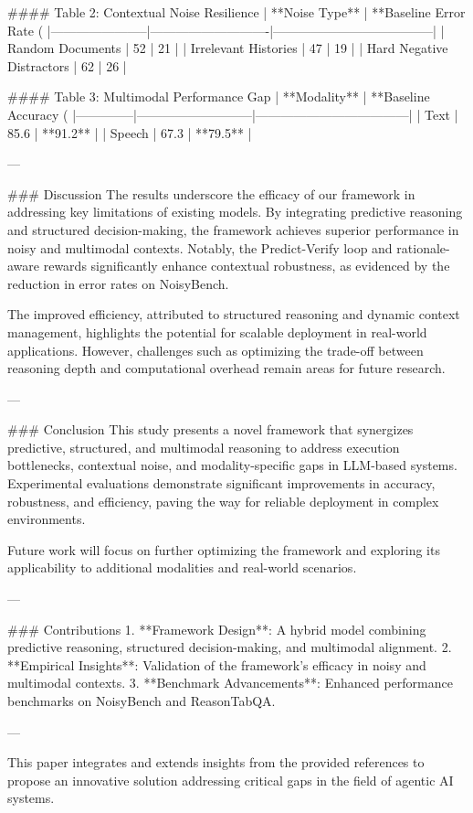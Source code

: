 #### Table 2: Contextual Noise Resilience
| **Noise Type**       | **Baseline Error Rate (%
|-----------------------|----------------------------|--------------------------------------|
| Random Documents     | 52                         | 21                                   |
| Irrelevant Histories | 47                         | 19                                   |
| Hard Negative Distractors | 62                     | 26                                   |

#### Table 3: Multimodal Performance Gap
| **Modality** | **Baseline Accuracy (%
|--------------|---------------------------|------------------------------------|
| Text         | 85.6                      | **91.2**                          |
| Speech       | 67.3                      | **79.5**                          |

---

### Discussion
The results underscore the efficacy of our framework in addressing key limitations of existing models. By integrating predictive reasoning and structured decision-making, the framework achieves superior performance in noisy and multimodal contexts. Notably, the Predict-Verify loop and rationale-aware rewards significantly enhance contextual robustness, as evidenced by the reduction in error rates on NoisyBench.

The improved efficiency, attributed to structured reasoning and dynamic context management, highlights the potential for scalable deployment in real-world applications. However, challenges such as optimizing the trade-off between reasoning depth and computational overhead remain areas for future research.

---

### Conclusion
This study presents a novel framework that synergizes predictive, structured, and multimodal reasoning to address execution bottlenecks, contextual noise, and modality-specific gaps in LLM-based systems. Experimental evaluations demonstrate significant improvements in accuracy, robustness, and efficiency, paving the way for reliable deployment in complex environments.

Future work will focus on further optimizing the framework and exploring its applicability to additional modalities and real-world scenarios.

---

### Contributions
1. **Framework Design**: A hybrid model combining predictive reasoning, structured decision-making, and multimodal alignment.
2. **Empirical Insights**: Validation of the framework's efficacy in noisy and multimodal contexts.
3. **Benchmark Advancements**: Enhanced performance benchmarks on NoisyBench and ReasonTabQA.

--- 

This paper integrates and extends insights from the provided references to propose an innovative solution addressing critical gaps in the field of agentic AI systems.